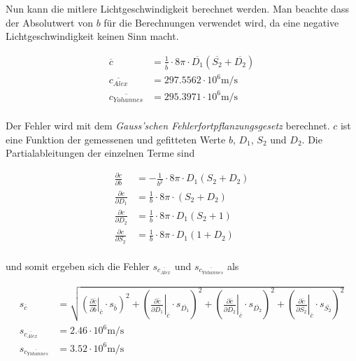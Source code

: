 Nun kann die mitlere Lichtgeschwindigkeit berechnet werden. Man beachte dass der
Absolutwert von $b$ f\"ur die  Berechnungen  verwendet  wird,  da  eine negative
Lichtgeschwindigkeit keinen Sinn macht.

\begin{align*}
    \overline{c}            &= \frac{1}{\overline{b}} \cdot 8\pi \cdot \overline{D_1}(\overline{S_2} + \overline{D_2}) \\
    \overline{c_{Alex}}     &= 297.5562 \cdot 10^{6} \textrm{m}/\textrm{s} \\
    \overline{c_{Yohannes}} &= 295.3971 \cdot 10^{6} \textrm{m}/\textrm{s} \\
\end{align*}

Der Fehler wird mit dem \emph{Gauss'schen Fehlerfortpflanzungsgesetz} berechnet.
$c$ ist eine Funktion der gemessenen und gefitteten Werte $b$,  $D_1$, $S_2$ und
$D_2$. Die Partialableitungen der einzelnen Terme sind

\begin{align*}
    \frac{\partial c}{\partial b}   &= -\frac{1}{b^2} \cdot 8\pi \cdot D_1(S_2 + D_2) \\
    \frac{\partial c}{\partial D_1} &= \frac{1}{b} \cdot 8\pi \cdot (S_2 + D_2) \\
    \frac{\partial c}{\partial D_2} &= \frac{1}{b} \cdot 8\pi \cdot D_1(S_2 + 1) \\
    \frac{\partial c}{\partial S_2} &= \frac{1}{b} \cdot 8\pi \cdot D_1(1 + D_2) \\
\end{align*}

und   somit    ergeben    sich    die   Fehler   $s_{\overline{c_{Alex}}}$   und
$s_{\overline{c_{Yohannes}}}$ als

\begin{align*}
    s_{\overline{c}} &= \sqrt{ \left( \left.\frac{\partial \overline{c}}{\partial \overline{b  }} \right\rvert_{\overline{c}} \cdot s_{\overline{b  }} \right)^2
                             + \left( \left.\frac{\partial \overline{c}}{\partial \overline{D_1}} \right\rvert_{\overline{c}} \cdot s_{\overline{D_1}} \right)^2
                             + \left( \left.\frac{\partial \overline{c}}{\partial \overline{D_2}} \right\rvert_{\overline{c}} \cdot s_{\overline{D_2}} \right)^2
                             + \left( \left.\frac{\partial \overline{c}}{\partial \overline{S_2}} \right\rvert_{\overline{c}} \cdot s_{\overline{S_2}} \right)^2 } \\
    s_{\overline{c_{Alex}}}     &= 2.46 \cdot 10^6 \textrm{m}/\textrm{s} \\
    s_{\overline{c_{Yohannes}}} &= 3.52 \cdot 10^6 \textrm{m}/\textrm{s} \\
\end{align*}

